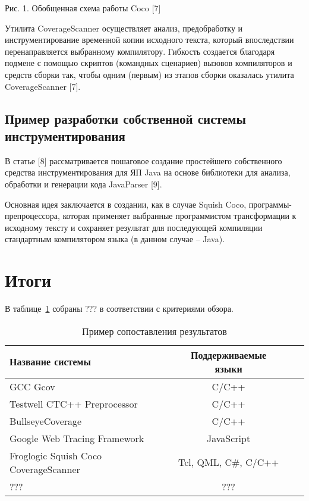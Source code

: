 Рис. 1. Обобщенная схема работы Coco [7]

Утилита CoverageScanner осуществляет анализ, предобработку и инструментирование временной копии исходного текста, который впоследствии перенаправляется выбранному компилятору. Гибкость создается благодаря подмене с помощью скриптов (командных сценариев) вызовов компиляторов и средств сборки так, чтобы одним (первым) из этапов сборки оказалась утилита CoverageScanner [7].

\subsection{Пример разработки собственной системы инструментирования}
В статье [8] рассматривается пошаговое создание простейшего собственного средства инструментирования для ЯП Java на основе библиотеки для анализа, обработки и генерации кода JavaParser [9].

Основная идея заключается в создании, как в случае Squish Coco, программы-препроцессора, которая применяет выбранные программистом трансформации к исходному тексту и сохраняет результат для последующей компиляции стандартным компилятором языка (в данном случае -- Java).

\section{Итоги}

В таблице~\ref{table:valuesCompare} собраны ??? в соответствии с критериями обзора.
\begin{table}
  \captionsetup{skip=5pt}
  \caption{Пример сопоставления результатов}
  \label{table:valuesCompare}
  \centering
  \begin{tabular}{|l|c|c|c|}
    \hline
    Название системы                      & Поддерживаемые языки  \\ \hline
    GCC Gcov                              & C/C++                 \\ \hline
    Testwell CTC++ Preprocessor           & C/C++                 \\ \hline
    BullseyeCoverage                      & C/C++                 \\ \hline
    Google Web Tracing Framework          & JavaScript            \\ \hline
    Froglogic Squish Coco CoverageScanner & Tcl, QML, C\#, C/C++  \\ \hline
    ???                                   & ???                   \\ \hline
  \end{tabular}
\end{table}

